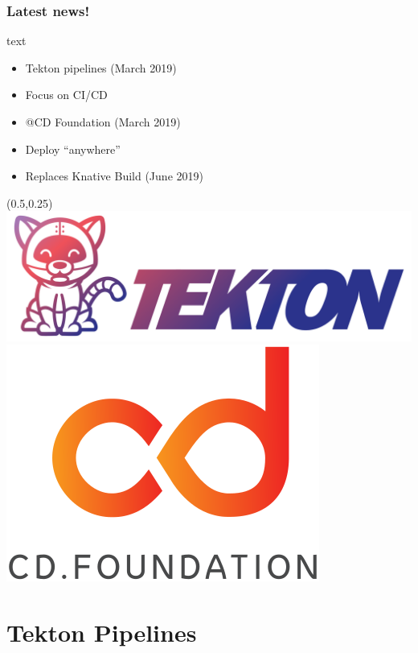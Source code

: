 \documentclass[aspectratio=169,11pt,hyperref={colorlinks=true}]{beamer}
\begin{document}
\begin{lblackrwhiteframe}
\begin{lblackrwhiteframe}
\begin{lblackrwhiteframe}
  \frametitle{Latest news!}
  \large
  \begin{beamercolorbox}[wd=0.35\paperwidth]{text}
    \begin{itemize}
      \item Tekton pipelines (March 2019)
      \item Focus on CI/CD
      \item @CD Foundation  (March 2019)
      \item Deploy ``anywhere''
      \item Replaces Knative Build (June 2019)
    \end{itemize}
  \end{beamercolorbox}%
  \begin{textblock*}{0.5\paperwidth}(0.5\paperwidth,0.25\paperheight)
    \centering
    \includegraphics[width=0.35\paperwidth]{img/tekton-horizontal-color.png}
    \includegraphics[width=0.20\paperwidth]{img/cdf-color.png}
  \end{textblock*}
\end{lblackrwhiteframe}

\section{Tekton Pipelines}


\end{lblackrwhiteframe}
\end{lblackrwhiteframe}
\end{document}
